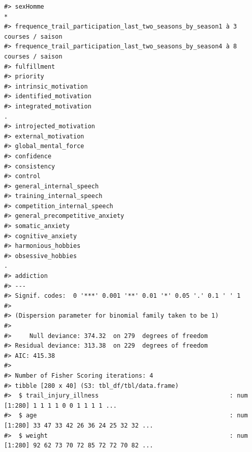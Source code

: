 \documentclass[
]{article}
\begin{document}
\begin{verbatim}
#> sexHomme                                                                       * 
#> frequence_trail_participation_last_two_seasons_by_season1 à 3 courses / saison   
#> frequence_trail_participation_last_two_seasons_by_season4 à 8 courses / saison   
#> fulfillment                                                                      
#> priority                                                                         
#> intrinsic_motivation                                                             
#> identified_motivation                                                            
#> integrated_motivation                                                          . 
#> introjected_motivation                                                           
#> external_motivation                                                              
#> global_mental_force                                                              
#> confidence                                                                       
#> consistency                                                                      
#> control                                                                          
#> general_internal_speech                                                          
#> training_internal_speech                                                         
#> competition_internal_speech                                                      
#> general_precompetitive_anxiety                                                   
#> somatic_anxiety                                                                  
#> cognitive_anxiety                                                                
#> harmonious_hobbies                                                               
#> obsessive_hobbies                                                              . 
#> addiction                                                                        
#> ---
#> Signif. codes:  0 '***' 0.001 '**' 0.01 '*' 0.05 '.' 0.1 ' ' 1
#> 
#> (Dispersion parameter for binomial family taken to be 1)
#> 
#>     Null deviance: 374.32  on 279  degrees of freedom
#> Residual deviance: 313.38  on 229  degrees of freedom
#> AIC: 415.38
#> 
#> Number of Fisher Scoring iterations: 4
#> tibble [280 x 40] (S3: tbl_df/tbl/data.frame)
#>  $ trail_injury_illness                                    : num [1:280] 1 1 1 1 0 0 1 1 1 1 ...
#>  $ age                                                     : num [1:280] 33 47 33 42 26 36 24 25 32 32 ...
#>  $ weight                                                  : num [1:280] 92 62 73 70 72 85 72 72 70 82 ...

\end{verbatim}
\end{document}
